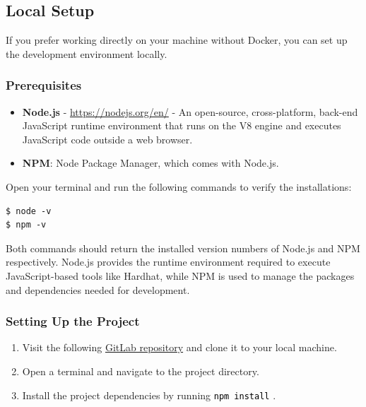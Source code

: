 \documentclass[12pt]{article}
\newcommand{\codegrey}[1]{%
  \texttt{\colorbox{black!4}{\textcolor{black}{#1}}}%
}
\begin{document}
\subsection{Local Setup}

If you prefer working directly on your machine without Docker, you can set up the development environment locally.

\subsubsection*{Prerequisites}
\begin{itemize}
    \item \textbf{Node.js} - \url{https://nodejs.org/en/} - An open-source, cross-platform, back-end JavaScript runtime environment that runs on the V8 engine and executes JavaScript code outside a web browser.
    \item \textbf{NPM}: Node Package Manager, which comes with Node.js.
\end{itemize}

\noindent
Open your terminal and run the following commands to verify the installations:

\begin{verbatim}
$ node -v
$ npm -v
\end{verbatim}

Both commands should return the installed version numbers of Node.js and NPM respectively. Node.js provides the runtime environment required to execute JavaScript-based tools like Hardhat, while NPM is used to manage the packages and dependencies needed for development.

\subsubsection*{Setting Up the Project}

\begin{enumerate}
    \item Visit the following \href{https://gitlab.fel.cvut.cz/radovluk/smart-contracts-exercises/-/tree/main/03-ERC20-CTUToken/task/task-code?ref_type=heads}{GitLab repository} and clone it to your local machine.
    \item Open a terminal and navigate to the project directory.
    \item Install the project dependencies by running \codegrey{npm install}.
\end{enumerate}
\end{document}
